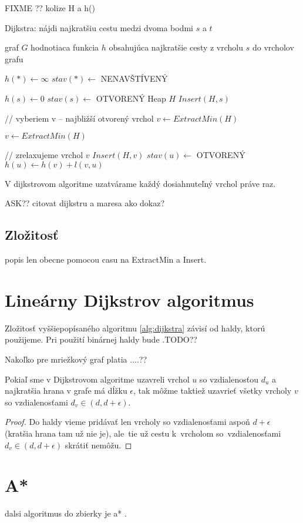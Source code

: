FIXME ?? kolize H a h()
\begin{algorithm}
\caption{Dijkstra: nájdi najkratšiu cestu medzi dvoma bodmi $s$ a $t$}
\label{alg:dijkstra}
\begin{algorithmic}[1] %
\REQUIRE graf $G$
\ENSURE hodnotiaca funkcia $h$ obsahujúca najkratšie cesty  z vrcholu $s$ do vrcholov grafu


\STATE $ h(*) \leftarrow \infty $
\STATE $ stav(*) \leftarrow$ NENAVŠTÍVENÝ

\STATE $h(s) \leftarrow 0$
\STATE $stav(s) \leftarrow $ OTVORENÝ
\STATE Heap $H$
\STATE $Insert(H, s)$

	
	\STATE // vyberiem v -- najbližší otvorený vrchol
	\STATE $v \leftarrow ExtractMin(H)$
	
		\STATE $v \leftarrow ExtractMin(H)$
	\ENDWHILE
	
	\STATE // zrelaxujeme vrchol $v$
			\STATE $Insert(H, v)$
			\STATE $stav(u) \leftarrow$ OTVORENÝ
			\STATE $h(u) \leftarrow h(v) + l(v, u)$
			
		\ENDIF
	\ENDFOR
\ENDWHILE

\end{algorithmic}
\end{algorithm}

\begin{theorem}
V dijkstrovom algoritme uzatvárame každý dosiahnuteľný vrchol práve raz.
\end{theorem}
ASK?? citovat dijkstru a maresa ako dokaz? 

\subsection{Zložitosť}
popis len obecne pomocou casu na ExtractMin a Insert.


\section{Lineárny Dijkstrov algoritmus}
Zložitosť vyššiepopísaného algoritmu \ref{alg:dijkstra}
závisí od haldy, ktorú použijeme. Pri použití binárnej haldy bude .TODO??

Nakoľko pre mriežkový graf platia ....??

\begin{theorem}
Pokiaľ sme v Dijkstrovom algoritme uzavreli vrchol $u$ so vzdialenosťou $d_u$ a najkratšia hrana v grafe má dĺžku $\epsilon$, tak môžme taktiež 
uzavrieť všetky vrcholy $v$ so vzdialenosťami $d_v \in (d, d + \epsilon)$.
\end{theorem}
\begin{proof}
Do haldy vieme pridávať len vrcholy so vzdialenosťami aspoň $d + \epsilon$ (kratšia hrana tam už nie je), 
ale~tie už cestu k~vrcholom so~vzdialenosťami
$d_v \in (d, d + \epsilon)$ skrátiť nemôžu.
\end{proof}

\section{A*}
dalsi algoritmus do zbierky je a* \cite{astar72}.
